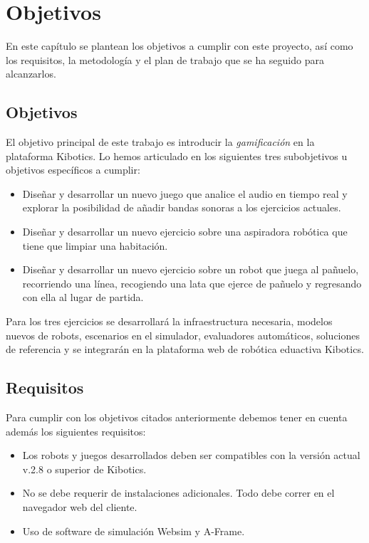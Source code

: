 \chapter{Objetivos }\label{objetivos}

En este capítulo se plantean los objetivos a cumplir con este proyecto, así como los requisitos, la metodología y el plan de trabajo que se ha seguido para alcanzarlos.

\section{Objetivos}

El objetivo principal de este trabajo es introducir la \textit{gamificación} en la plataforma Kibotics. Lo hemos articulado en los siguientes tres subobjetivos u objetivos específicos a cumplir:

\begin{itemize}
    \item Diseñar y desarrollar un nuevo juego que analice el audio en tiempo real y explorar la posibilidad de añadir bandas sonoras a los ejercicios actuales. 

    \item Diseñar y desarrollar un nuevo ejercicio sobre una aspiradora robótica que tiene que limpiar una habitación.

    \item Diseñar y desarrollar un nuevo ejercicio sobre un robot que juega al pañuelo, recorriendo una línea, recogiendo una lata que ejerce de pañuelo y regresando con ella al lugar de partida.
    
\end{itemize}

Para los tres ejercicios se desarrollará la infraestructura necesaria, modelos nuevos de robots, escenarios en el simulador, evaluadores automáticos, soluciones de referencia y se integrarán en la plataforma web de robótica eduactiva Kibotics.
    


\newpage

\section{Requisitos}
Para cumplir con los objetivos citados anteriormente debemos tener en cuenta además los siguientes  requisitos: 
\begin{itemize}
    \item Los robots y juegos desarrollados deben ser compatibles con la versión actual v.2.8 o superior de Kibotics.
    \item No se debe requerir de instalaciones adicionales. Todo debe correr en el navegador web del cliente. 
    \item Uso de software de simulación Websim y A-Frame.
\end{itemize}

